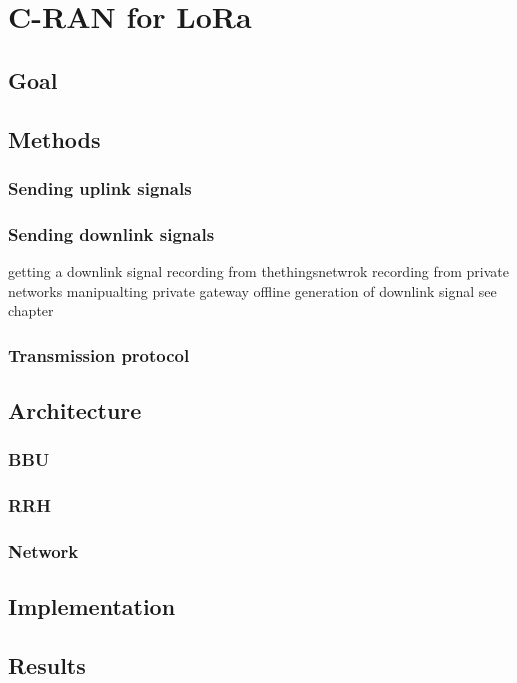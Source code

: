 \chapter{C-RAN for LoRa}

\section{Goal}

\section{Methods}
\subsection{Sending uplink signals}
\subsection{Sending downlink signals}
getting a downlink signal
recording from thethingsnetwrok
recording from private networks
manipualting private gateway
offline generation of downlink signal see chapter
\subsection{Transmission protocol}


\section{Architecture}
\subsection{BBU}
\subsection{RRH}
\subsection{Network}

\section{Implementation}

\section{Results}

